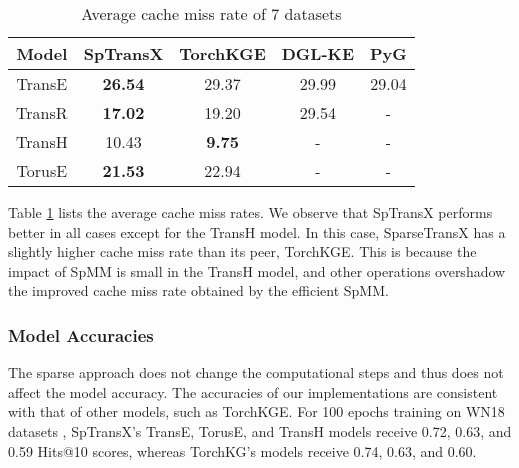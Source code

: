 \begin{table}[h]
\caption{Average cache miss rate of 7 datasets }
\label{table:cache-miss}
\begin{center}
\begin{small}
\begin{sc}
\begin{tabular}{ccccc}
\toprule
Model  & SpTransX       & TorchKGE & DGL-KE & PyG   \\
\midrule
TransE    & \textbf{26.54} & 29.37         & 29.99  & 29.04 \\
TransR    & \textbf{17.02} & 19.20         & 29.54  & -     \\
TransH    & 10.43          & \textbf{9.75} & -      & -     \\
TorusE    & \textbf{21.53} & 22.94         & -      & -                 \\                        
\bottomrule
\end{tabular}
\end{sc}
\end{small}
\end{center}
\vskip -0.1in
\end{table}

Table \ref{table:cache-miss} lists the average cache miss rates. We observe that SpTransX performs better in all cases except for the TransH model. In this case, SparseTransX has a slightly higher cache miss rate than its peer, TorchKGE. This is because the impact of SpMM is small in the TransH model, and other operations overshadow the improved cache miss rate obtained by the efficient SpMM.


\subsubsection{Model Accuracies}
The sparse approach does not change the computational steps and thus does not affect the model accuracy. The accuracies of our implementations are consistent with that of other models, such as TorchKGE. For 100 epochs training on WN18 datasets , SpTransX's TransE, TorusE, and TransH models receive 0.72, 0.63, and 0.59 Hits@10 scores, whereas TorchKG's models receive 0.74, 0.63, and 0.60. 
